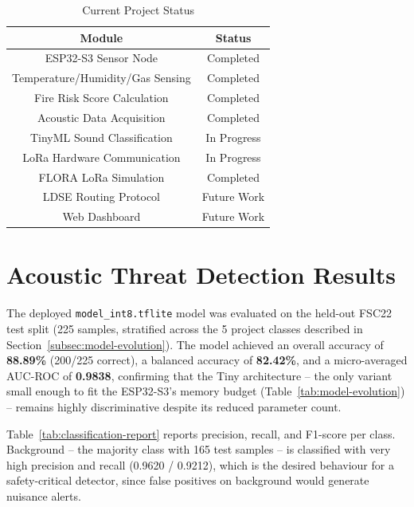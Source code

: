 \begin{table}[H]
\centering
\caption{Current Project Status}
\begin{tabular}{|c|c|}
\hline
Module & Status\\
\hline
ESP32-S3 Sensor Node & Completed\\
\hline
Temperature/Humidity/Gas Sensing & Completed\\
\hline
Fire Risk Score Calculation & Completed\\
\hline
Acoustic Data Acquisition & Completed\\
\hline
TinyML Sound Classification & In Progress\\
\hline
LoRa Hardware Communication & In Progress\\
\hline
FLORA LoRa Simulation & Completed\\
\hline
LDSE Routing Protocol & Future Work\\
\hline
Web Dashboard & Future Work\\
\hline
\end{tabular}
\end{table}



\section{Acoustic Threat Detection Results}
\label{sec:acoustic-results}

The deployed \texttt{model\_int8.tflite} model was evaluated on the held-out
FSC22 test split (225 samples, stratified across the 5 project classes
described in Section~\ref{subsec:model-evolution}). The model achieved an
overall accuracy of \textbf{88.89\%} (200/225 correct), a balanced accuracy
of \textbf{82.42\%}, and a micro-averaged AUC-ROC of \textbf{0.9838},
confirming that the Tiny architecture -- the only variant small enough to
fit the ESP32-S3's memory budget (Table~\ref{tab:model-evolution}) --
remains highly discriminative despite its reduced parameter count.

Table~\ref{tab:classification-report} reports precision, recall, and
F1-score per class. Background -- the majority class with 165 test samples
-- is classified with very high precision and recall (0.9620 / 0.9212),
which is the desired behaviour for a safety-critical detector, since false
positives on background would generate nuisance alerts.

